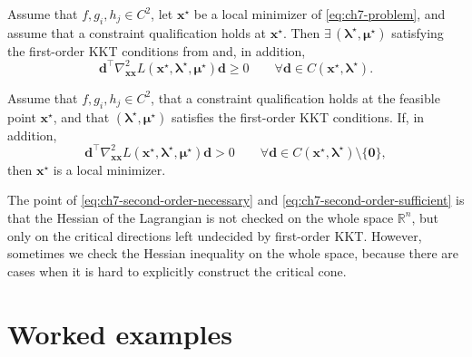 \begin{theorem}
\label{thm:ch7-kkt-second-necessary}
Assume that $f,g_i,h_j\in C^2$, let $\mathbf{x}^\star$ be a local minimizer of
\eqref{eq:ch7-problem}, and assume that a constraint qualification holds at
$\mathbf{x}^\star$. Then \(\exists\, (\boldsymbol{\lambda}^\star,\boldsymbol{\mu}^\star)\)
satisfying the
first-order KKT conditions from  and, in addition,
\begin{equation}
  \label{eq:ch7-second-order-necessary}
  \mathbf{d}^\top
  \nabla_{\mathbf{x}\mathbf{x}}^2
  L(\mathbf{x}^\star,\boldsymbol{\lambda}^\star,\boldsymbol{\mu}^\star)
  \mathbf{d}
  \ge 0
  \qquad
  \forall \mathbf{d}\in C(\mathbf{x}^\star,\boldsymbol{\lambda}^\star).
\end{equation}
\end{theorem}

\begin{theorem}
\label{thm:ch7-kkt-second-sufficient}
Assume that $f,g_i,h_j\in C^2$, that a constraint qualification holds at the
feasible point $\mathbf{x}^\star$, and that
$(\boldsymbol{\lambda}^\star,\boldsymbol{\mu}^\star)$ satisfies the first-order
KKT conditions. If, in addition,
\begin{equation}
  \label{eq:ch7-second-order-sufficient}
  \mathbf{d}^\top
  \nabla_{\mathbf{x}\mathbf{x}}^2
  L(\mathbf{x}^\star,\boldsymbol{\lambda}^\star,\boldsymbol{\mu}^\star)
  \mathbf{d}
  > 0
  \qquad
  \forall \mathbf{d}\in C(\mathbf{x}^\star,\boldsymbol{\lambda}^\star)
  \setminus \{\mathbf{0}\},
\end{equation}
then $\mathbf{x}^\star$ is a local minimizer.
\end{theorem}

The point of \eqref{eq:ch7-second-order-necessary} and
\eqref{eq:ch7-second-order-sufficient} is that the Hessian of the Lagrangian is
not checked on the whole space $\mathbb{R}^n$, but only on the critical
directions left undecided by first-order KKT. However, sometimes we check the
Hessian inequality on the whole space, because there are cases when it is hard
to explicitly construct the critical cone.

\section{Worked examples}
\label{sec:ch7-examples}
